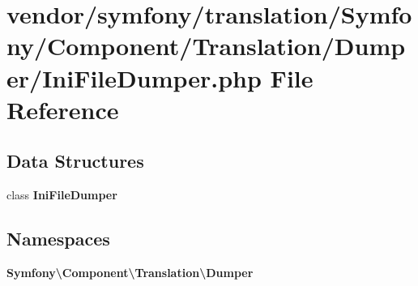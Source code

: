 \section{vendor/symfony/translation/\+Symfony/\+Component/\+Translation/\+Dumper/\+Ini\+File\+Dumper.php File Reference}
\label{_ini_file_dumper_8php}
\subsection*{Data Structures}
\begin{DoxyCompactItemize}
\item 
class {\bf Ini\+File\+Dumper}
\end{DoxyCompactItemize}
\subsection*{Namespaces}
\begin{DoxyCompactItemize}
\item 
 {\bf Symfony\textbackslash{}\+Component\textbackslash{}\+Translation\textbackslash{}\+Dumper}
\end{DoxyCompactItemize}

